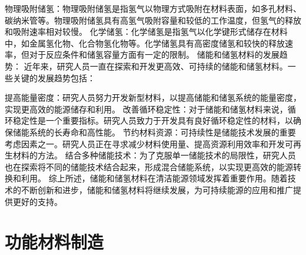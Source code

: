 物理吸附储氢：物理吸附储氢是指氢气以物理方式吸附在材料表面，如多孔材料、碳纳米管等。物理吸附储氢具有高氢气吸附容量和较低的工作温度，但氢气的释放和吸附速率相对较慢。
化学储氢：化学储氢是指氢气以化学键形式储存在材料中，如金属氢化物、化合物氢化物等。化学储氢具有高密度储氢和较快的释放速率，但对于反应条件和储氢容量方面有一定的限制。
储能和储氢材料的发展趋势：
近年来，研究人员一直在探索和开发更高效、可持续的储能和储氢材料。一些关键的发展趋势包括：

提高能量密度：研究人员努力开发新型材料，以提高储能和储氢系统的能量密度，实现更高效的能源储存和利用。
改善循环稳定性：对于储能和储氢材料来说，循环稳定性是一个重要指标。研究人员致力于开发具有良好循环稳定性的材料，以确保储能系统的长寿命和高性能。
节约材料资源：可持续性是储能技术发展的重要考虑因素之一。研究人员正在寻求减少材料使用量、提高资源利用效率和开发可再生材料的方法。
结合多种储能技术：为了克服单一储能技术的局限性，研究人员也在探索将不同的储能技术结合起来，形成混合储能系统，以实现更高效的能源转换和利用。
综上所述，储能和储氢材料在清洁能源领域发挥着重要作用。随着技术的不断创新和进步，储能和储氢材料将继续发展，为可持续能源的应用和推广提供更好的支持。


\section{功能材料制造}
